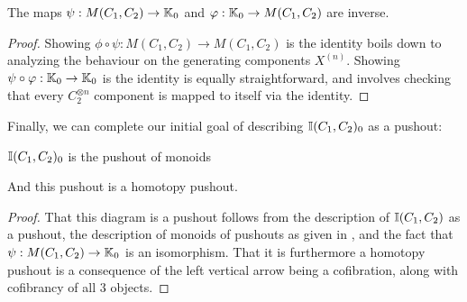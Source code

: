 \documentclass[12pt]{amsart}
\begin{document}
\begin{theorem}\label{thm:pushout-description-K0}
	The maps $\psi: M(C_1,C_2) \to \mathbb{K}_0$ and $\varphi: \mathbb{K}_0 \to M(C_1,C_2)$ are inverse.
\end{theorem}
\begin{proof}
	Showing $\phi \circ \psi: M(C_1,C_2) \to M(C_1,C_2)$ is the identity boils down to analyzing the behaviour on the generating components $X^{(n)}$.
	Showing $\psi \circ \varphi: \mathbb{K}_0 \to \mathbb{K}_0$ is the identity is equally straightforward, and involves checking that every $C_2^{\otimes n}$ component is mapped to itself via the identity.
\end{proof}
Finally, we can complete our initial goal of describing $\mathbb{I}(C_1,C_2)_0$ as a pushout: 
\begin{lemma}\label{lem:pushout-description-interval}
	$\mathbb{I}(C_1,C_2)_0$ is the pushout of monoids 
	\begin{center}
	\end{center}
	And this pushout is a homotopy pushout.
\end{lemma}
\begin{proof}
	That this diagram is a pushout follows from the description of $\mathbb{I}(C_1,C_2)$ as a pushout, the description of monoids of pushouts as given in \cite{BergerMoerdijk2012}, and the fact that $\psi: M(C_1,C_2) \to \mathbb{K}_0$ is an isomorphism.
	That it is furthermore a homotopy pushout is a consequence of the left vertical arrow being a cofibration, along with cofibrancy of all $3$ objects.
\end{proof}
\end{document}
